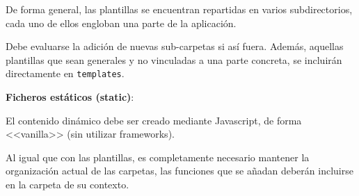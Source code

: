 De forma general, las plantillas se encuentran repartidas en varios
subdirectorios, cada uno de ellos engloban una parte de la aplicación.

\begin{figure}[H]
\end{figure}

Debe evaluarse la adición de nuevas sub-carpetas si así fuera. Además, aquellas
plantillas que sean generales y no vinculadas a una parte concreta, se incluirán
directamente en \texttt{templates}.

\textbf{Ficheros estáticos (static)}: 

El contenido dinámico debe ser creado mediante Javascript, de forma <<vanilla>> 
(sin utilizar frameworks). 

Al igual que con las plantillas, es completamente necesario mantener la
organización actual de las carpetas, las funciones que se añadan deberán
incluirse en la carpeta de su contexto.

